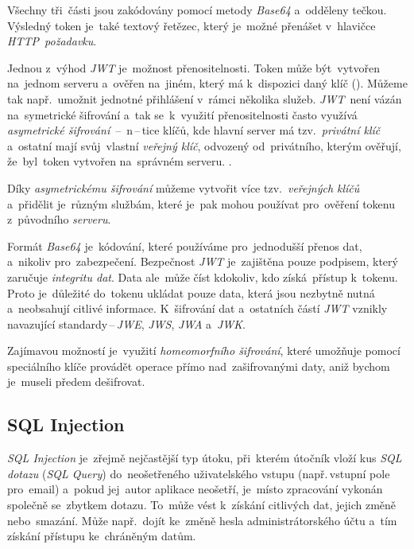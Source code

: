 \documentclass[11pt,a4paper]{report}
\begin{document}
                Všechny tři~části jsou zakódovány pomocí metody \emph{Base64} a~odděleny tečkou. Výsledný token je~také textový řetězec, který je~možné přenášet v~hlavičce \emph{HTTP~požadavku}.

                Jednou z~výhod \emph{JWT} je~možnost přenositelnosti. Token může být~vytvořen na~jednom serveru a~ověřen na~jiném, který má k~dispozici daný klíč (\cite{ieee:jwt}). Můžeme tak např.~umožnit jednotné přihlášení v~rámci několika služeb. \emph{JWT}~není vázán na~symetrické šifrování a~tak se~k~využití přenositelnosti často využívá \emph{asymetrické šifrování}~--~n\,--\,tice klíčů, kde hlavní server má tzv.~\emph{privátní klíč} a~ostatní mají svůj~vlastní \emph{veřejný klíč}, odvozený od~privátního, kterým ověřují, že~byl~token vytvořen na~správném serveru. \cite{miguelgrinbergJSONTokens}.
                
                Díky \emph{asymetrickému šifrování} můžeme vytvořit více tzv.~\emph{veřejných klíčů} a~přidělit je~různým službám, které je~pak mohou používat pro~ověření tokenu z~původního \emph{serveru}.

                Formát \emph{Base64} je~kódování, které používáme pro~jednodušší přenos dat, a~nikoliv pro~zabezpečení. Bezpečnost \emph{JWT} je~zajištěna pouze podpisem, který zaručuje \emph{integritu dat}. Data ale~může číst kdokoliv, kdo získá~přístup k~tokenu. Proto je~důležité do~tokenu ukládat pouze data, která jsou nezbytně nutná a~neobsahují citlivé informace. K~šifrování dat a~ostatních částí \emph{JWT} vznikly navazující standardy\,--\,\emph{JWE}, \emph{JWS}, \emph{JWA} a~\emph{JWK}. \cite{jwtesak}

                Zajímavou možností je~využití \emph{homeomorfního šifrování}, které umožňuje pomocí speciálního klíče provádět operace přímo nad~zašifrovanými daty, aniž bychom je~museli předem dešifrovat. \cite{graham2021ethical}

            \subsection{SQL Injection}
                \emph{SQL Injection} je~zřejmě nejčastější typ útoku, při~kterém útočník vloží kus \emph{SQL dotazu} (\emph{SQL Query}) do~neošetřeného uživatelského vstupu (např.\,vstupní pole pro~email) a~pokud jej~autor aplikace neošetří, je~místo zpracování vykonán společně se~zbytkem dotazu. To~může vést k~získání citlivých dat, jejich změně nebo~smazání. Může např.~dojít ke~změně hesla administrátorského účtu a~tím získání přístupu ke~chráněným datům.
\end{document}
